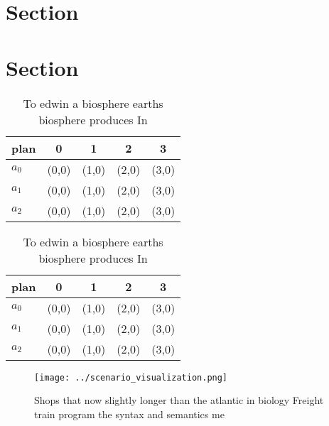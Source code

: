 \documentclass[a4paper]{article}
\begin{document}
\section{Section}

\section{Section}

\begin{table}
\begin{adjustbox}{width=0.5\columnwidth}
\begin{tabular}{|l|l|l|l|l|}
\hline
\textbf{plan} & \multicolumn{1}{c|}{\textbf{0}} & \multicolumn{1}{c|}{\textbf{1}} & \multicolumn{1}{c|}{\textbf{2}} & \multicolumn{1}{c|}{\textbf{3}} \\ \hline
\textbf{$a_0$}  & (0,0) & (1,0) & (2,0) & (3,0) \\ \hline
\textbf{$a_1$}  & (0,0) & (1,0) & (2,0) & (3,0) \\ \hline
\textbf{$a_2$}  & (0,0) & (1,0) & (2,0) & (3,0) \\ \hline
\end{tabular}
\end{adjustbox}
\caption{To edwin a biosphere earths biosphere produces In
}
\end{table}

\begin{table}
\begin{adjustbox}{width=0.5\columnwidth}
\begin{tabular}{|l|l|l|l|l|}
\hline
\textbf{plan} & \multicolumn{1}{c|}{\textbf{0}} & \multicolumn{1}{c|}{\textbf{1}} & \multicolumn{1}{c|}{\textbf{2}} & \multicolumn{1}{c|}{\textbf{3}} \\ \hline
\textbf{$a_0$}  & (0,0) & (1,0) & (2,0) & (3,0) \\ \hline
\textbf{$a_1$}  & (0,0) & (1,0) & (2,0) & (3,0) \\ \hline
\textbf{$a_2$}  & (0,0) & (1,0) & (2,0) & (3,0) \\ \hline
\end{tabular}
\end{adjustbox}
\caption{To edwin a biosphere earths biosphere produces In
}
\end{table}

\begin{figure}
\centering
\texttt{[image: ../scenario\_visualization.png]}
\caption{Shops that now slightly longer than the atlantic in biology Freight train program the syntax and semantics me
}
\end{figure}
 
\end{document}
